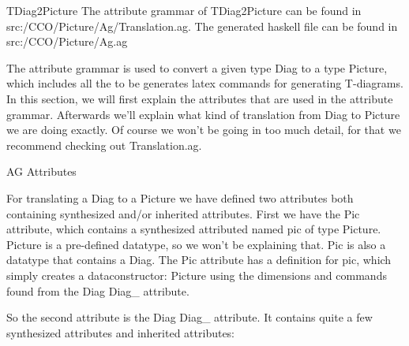 \documentclass{article}
\begin{document}
\begin{subsection}{TDiag2Picture}
The attribute grammar of TDiag2Picture can be found in src:/CCO/Picture/Ag/Translation.ag.
The generated haskell file can be found in src:/CCO/Picture/Ag.ag

\hfill \break

The attribute grammar is used to convert a given type Diag to a type Picture, which includes all the to be generates latex commands for generating T-diagrams. In this section, we will first explain the attributes that are used in the attribute grammar. Afterwards we'll explain what kind of translation from Diag to Picture we are doing exactly. Of course we won't be going in too much detail, for that we recommend checking out Translation.ag.

\begin{subsubsection}{AG Attributes}

For translating a Diag to a Picture we have defined two attributes both containing synthesized and/or inherited attributes.
First we have the Pic attribute, which contains a synthesized attributed named pic of type Picture. Picture is a pre-defined datatype, so we won't be explaining that. Pic is also a datatype that contains a Diag. The Pic attribute has a definition for pic, which simply creates a dataconstructor: Picture using the dimensions and commands found from the Diag Diag\_ attribute.

\hfill \break
So the second attribute is the Diag Diag\_ attribute. It contains quite a few synthesized attributes and inherited attributes:


\end{subsubsection}
\end{subsection}
\end{document}
